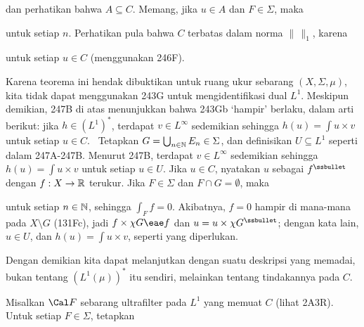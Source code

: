 { 
      
\noindent dan perhatikan bahwa $A\subseteq C$. Memang, jika $u\in A$ dan
$F\in\Sigma$, maka
      
      
\noindent untuk setiap $n$. Perhatikan pula bahwa $C$ terbatas dalam norma
$\|\,\|_1$, karena
      
      
\noindent untuk setiap $u\in C$ (menggunakan 246F).
      
\medskip 
      
 Karena teorema ini hendak dibuktikan untuk ruang ukur
sebarang $(X,\Sigma,\mu)$, kita tidak dapat menggunakan 243G untuk
mengidentifikasi dual $L^1$. Meskipun demikian, 247B di atas menunjukkan bahwa
243Gb `hampir' berlaku, dalam arti berikut: jika $h\in(L^1)^*$, terdapat
$v\in L^{\infty}$ sedemikian sehingga $h(u)=\int u\times v$ untuk setiap
$u\in C$. \Prf\ Tetapkan $G=\bigcup_{n\in\Bbb N}E_n\in\Sigma$, dan definisikan
$U\subseteq L^1$ seperti dalam 247A-247B. Menurut 247B, terdapat
$v\in L^{\infty}$ sedemikian sehingga $h(u)=\int u\times v$ untuk setiap
$u\in U$. Jika $u\in C$, nyatakan $u$ sebagai $f^{\ssbullet}$ dengan
$f:X\to\Bbb R$ terukur. Jika $F\in\Sigma$ dan $F\cap G=\emptyset$, maka
      
      
\noindent untuk setiap $n\in\Bbb N$, sehingga $\int_Ff=0$. Akibatnya,
$f=0$ hampir di mana-mana pada $X\setminus G$ (131Fc), jadi
$f\times\chi G\eae f$ dan $u=u\times\chi G^{\ssbullet}$; dengan kata lain,
$u\in U$, dan $h(u)=\int u\times v$, seperti yang diperlukan.
\Qed 
            
\medskip 
      
 Dengan demikian kita dapat melanjutkan dengan suatu deskripsi
yang memadai, bukan tentang $(L^1(\mu))^*$ itu sendiri, melainkan tentang
tindakannya pada $C$.
      
Misalkan $\Cal F$ sebarang ultrafilter pada $L^1$ yang memuat $C$ (lihat 2A3R).
Untuk setiap $F\in\Sigma$, tetapkan
      
      
}
